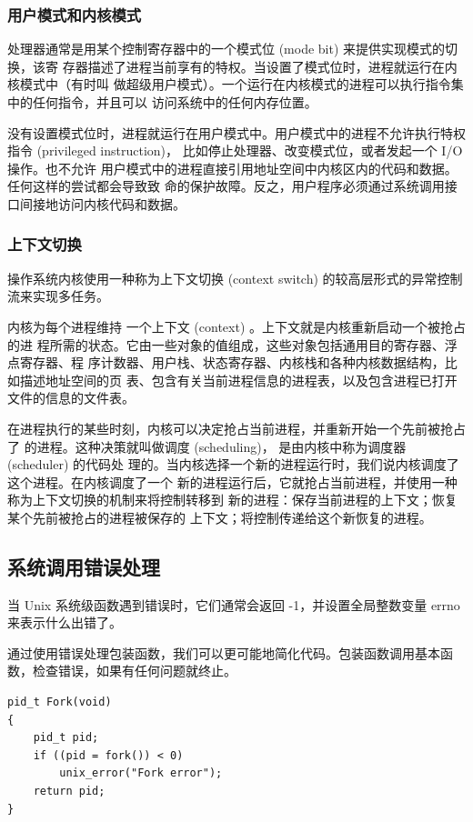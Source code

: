 \subsubsection{用户模式和内核模式}

处理器通常是用某个控制寄存器中的一个模式位 (mode bit) 来提供实现模式的切换，该寄
存器描述了进程当前享有的特权。当设置了模式位时，进程就运行在内核模式中（有时叫
做超级用户模式）。一个运行在内核模式的进程可以执行指令集中的任何指令，并且可以
访问系统中的任何内存位置。

没有设置模式位时，进程就运行在用户模式中。用户模式中的进程不允许执行特权指令
(privileged instruction)， 比如停止处理器、改变模式位，或者发起一个 I/O 操作。也不允许
用户模式中的进程直接引用地址空间中内核区内的代码和数据。任何这样的尝试都会导致致
命的保护故障。反之，用户程序必须通过系统调用接口间接地访问内核代码和数据。

\subsubsection{上下文切换}

操作系统内核使用一种称为上下文切换 (context switch) 的较高层形式的异常控制流来实现多任务。

内核为每个进程维持 一个上下文 (context) 。上下文就是内核重新启动一个被抢占的进
程所需的状态。它由一些对象的值组成，这些对象包括通用目的寄存器、浮点寄存器、程
序计数器、用户栈、状态寄存器、内核栈和各种内核数据结构，比如描述地址空间的页
表、包含有关当前进程信息的进程表，以及包含进程已打开文件的信息的文件表。

在进程执行的某些时刻，内核可以决定抢占当前进程，并重新开始一个先前被抢占了
的进程。这种决策就叫做调度 (scheduling)， 是由内核中称为调度器 (scheduler) 的代码处
理的。当内核选择一个新的进程运行时，我们说内核调度了这个进程。在内核调度了一个
新的进程运行后，它就抢占当前进程，并使用一种称为上下文切换的机制来将控制转移到
新的进程：保存当前进程的上下文；恢复某个先前被抢占的进程被保存的
上下文；将控制传递给这个新恢复的进程。

\subsection{系统调用错误处理}

当 Unix 系统级函数遇到错误时，它们通常会返回 -1，并设置全局整数变量 errno 来表示什么出错了。

通过使用错误处理包装函数，我们可以更可能地简化代码。包装函数调用基本函数，检查错误，如果有任何问题就终止。

\begin{lstlisting}[style=CStyle]
pid_t Fork(void)
{
    pid_t pid;
    if ((pid = fork()) < 0)
        unix_error("Fork error");
    return pid;
}
\end{lstlisting}


